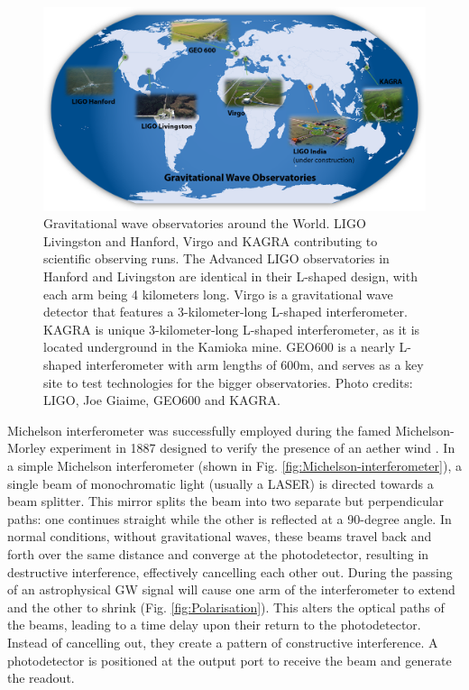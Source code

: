 \begin{figure}
    \centering
    \includegraphics[width=\textwidth]{figures/basic_data_analysis/GW-observatories.png}
    \caption{Gravitational wave observatories around the World. LIGO Livingston and Hanford, Virgo and KAGRA contributing to scientific observing runs. The Advanced LIGO observatories in Hanford and Livingston are identical in their L-shaped design, with each arm being 4 kilometers long. Virgo is a gravitational wave detector that features a 3-kilometer-long L-shaped interferometer. KAGRA is unique 3-kilometer-long L-shaped interferometer, as it is located underground in the Kamioka mine. GEO600 is a nearly L-shaped interferometer with arm lengths of 600m, and serves as a key site to test technologies for the bigger observatories. Photo credits: LIGO, Joe Giaime, GEO600 and KAGRA.}
    \label{fig:GW-observatories}
\end{figure}


Michelson interferometer was successfully employed during the famed Michelson-Morley experiment in 1887 designed to verify the presence of an aether wind \cite{Michelson:1887zz}. In a simple Michelson interferometer (shown in Fig. \ref{fig:Michelson-interferometer}), a single beam of monochromatic light (usually a LASER) is directed towards a beam splitter. This mirror splits the beam into two separate but perpendicular paths: one continues straight while the other is reflected at a 90-degree angle. In normal conditions, without gravitational waves, these beams travel back and forth over the same distance and converge at the photodetector, resulting in destructive interference, effectively cancelling each other out. During the passing of an astrophysical GW signal will cause one arm of the interferometer to extend and the other to shrink (Fig. \ref{fig:Polarisation}). This alters the optical paths of the beams, leading to a time delay upon their return to the photodetector. Instead of cancelling out, they create a pattern of constructive interference. A photodetector is positioned at the output port to receive the beam and generate the readout. 

